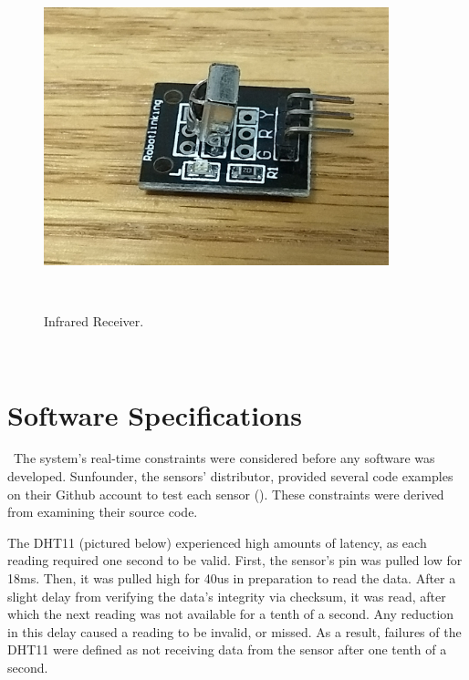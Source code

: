 \documentclass[letterpaper, 12pt]{article}
\begin{document}
~\newline 
\begin{figure}[H]
	\centering
	\includegraphics[width=10cm,height=10cm,keepaspectratio]{infrared.jpg}
	\caption[Sensor3]{Infrared Receiver.}
	\label{fig:infrared}
\end{figure}

~\newpage

\section{Software Specifications}

~\indent The system's real-time constraints were considered before any software was developed.  Sunfounder, the sensors' distributor, provided several code examples on their Github account to test each sensor (\cite{sunfounder2018}).  These constraints were derived from examining their source code.
  
\indent The DHT11 (pictured below) experienced high amounts of latency, as each reading required one second to be valid.  First, the sensor's pin was pulled low for 18ms. Then, it was pulled high for 40us in preparation to read the data.  After a slight delay from verifying the data's integrity via checksum, it was read, after which the next reading was not available for a tenth of a second.  Any reduction in this delay caused a reading to be invalid, or missed.  As a result, failures of the DHT11 were defined as not receiving data from the sensor after one tenth of a second.
\end{document}
